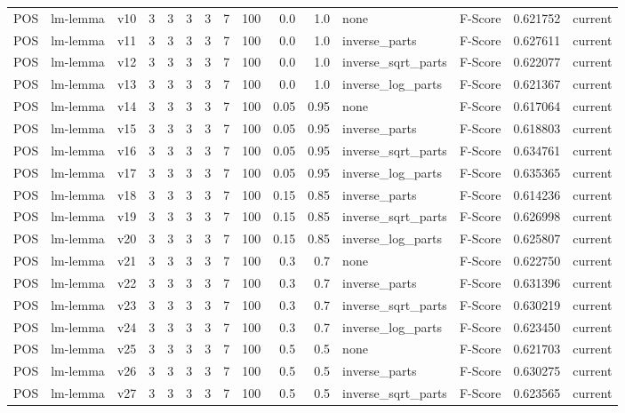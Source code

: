 \documentclass{article}
\begin{document}
\begin{xltabular}{\linewidth}{@{}lYcrrrrrrrrYlrl@{}}
POS & lm-lemma & v10 & 3 & 3 & 3 & 3 & 7 & 100 & 0.0 & 1.0 & none & F-Score & 0.621752 & current \\
POS & lm-lemma & v11 & 3 & 3 & 3 & 3 & 7 & 100 & 0.0 & 1.0 & inverse\_parts & F-Score & 0.627611 & current \\
POS & lm-lemma & v12 & 3 & 3 & 3 & 3 & 7 & 100 & 0.0 & 1.0 & inverse\_sqrt\_parts & F-Score & 0.622077 & current \\
POS & lm-lemma & v13 & 3 & 3 & 3 & 3 & 7 & 100 & 0.0 & 1.0 & inverse\_log\_parts & F-Score & 0.621367 & current \\
POS & lm-lemma & v14 & 3 & 3 & 3 & 3 & 7 & 100 & 0.05 & 0.95 & none & F-Score & 0.617064 & current \\
POS & lm-lemma & v15 & 3 & 3 & 3 & 3 & 7 & 100 & 0.05 & 0.95 & inverse\_parts & F-Score & 0.618803 & current \\
POS & lm-lemma & v16 & 3 & 3 & 3 & 3 & 7 & 100 & 0.05 & 0.95 & inverse\_sqrt\_parts & F-Score & 0.634761 & current \\
POS & lm-lemma & v17 & 3 & 3 & 3 & 3 & 7 & 100 & 0.05 & 0.95 & inverse\_log\_parts & F-Score & 0.635365 & current \\
POS & lm-lemma & v18 & 3 & 3 & 3 & 3 & 7 & 100 & 0.15 & 0.85 & inverse\_parts & F-Score & 0.614236 & current \\
POS & lm-lemma & v19 & 3 & 3 & 3 & 3 & 7 & 100 & 0.15 & 0.85 & inverse\_sqrt\_parts & F-Score & 0.626998 & current \\
POS & lm-lemma & v20 & 3 & 3 & 3 & 3 & 7 & 100 & 0.15 & 0.85 & inverse\_log\_parts & F-Score & 0.625807 & current \\
POS & lm-lemma & v21 & 3 & 3 & 3 & 3 & 7 & 100 & 0.3 & 0.7 & none & F-Score & 0.622750 & current \\
POS & lm-lemma & v22 & 3 & 3 & 3 & 3 & 7 & 100 & 0.3 & 0.7 & inverse\_parts & F-Score & 0.631396 & current \\
POS & lm-lemma & v23 & 3 & 3 & 3 & 3 & 7 & 100 & 0.3 & 0.7 & inverse\_sqrt\_parts & F-Score & 0.630219 & current \\
POS & lm-lemma & v24 & 3 & 3 & 3 & 3 & 7 & 100 & 0.3 & 0.7 & inverse\_log\_parts & F-Score & 0.623450 & current \\
POS & lm-lemma & v25 & 3 & 3 & 3 & 3 & 7 & 100 & 0.5 & 0.5 & none & F-Score & 0.621703 & current \\
POS & lm-lemma & v26 & 3 & 3 & 3 & 3 & 7 & 100 & 0.5 & 0.5 & inverse\_parts & F-Score & 0.630275 & current \\
POS & lm-lemma & v27 & 3 & 3 & 3 & 3 & 7 & 100 & 0.5 & 0.5 & inverse\_sqrt\_parts & F-Score & 0.623565 & current \\

\end{xltabular}
\end{document}
